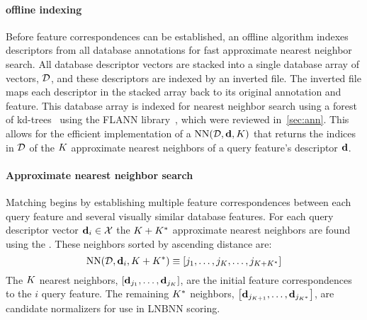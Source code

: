         \paragraph{offline indexing}
            Before feature correspondences can be established, an offline algorithm indexes descriptors from all
              database annotations for fast approximate nearest neighbor search.
            All database descriptor vectors are stacked into a single database array of vectors, %
            $\mathcal{D}$, %
            and these descriptors are indexed by an inverted file.
            The inverted file maps each descriptor in the stacked array back to its original annotation and
              feature.
            This database array is indexed for nearest neighbor search using a forest of
              kd-trees~\cite{silpa_anan_optimised_2008} using the FLANN library~\cite{muja_fast_2009}, which were
              reviewed in~\cref{sec:ann}.
            This allows for the efficient implementation of a   %
            $\operatorname{NN}(\mathcal{D}, \mathbf{d}, K)$  %
            that returns the indices in $\mathcal{D}$ of the $K$ approximate nearest neighbors of a query feature's
              descriptor $\mathbf{d}$.

        \paragraph{Approximate nearest neighbor search}

            Matching begins by establishing multiple feature correspondences between each query feature and
              several visually similar database features.
            For each query descriptor vector $\mathbf{d}_i \in \mathcal{X}$ the $K + K^{*}$ approximate nearest neighbors are
              found using the .
            These neighbors sorted by ascending distance are:
            \begin{equation}
                \operatorname{NN}(\mathcal{D}, \mathbf{d}_i, K + K^{*}) \equiv \left[j_1{}, \ldots{}, j_{K}, \ldots, j_{K + K^{*}}\right]
            \end{equation}
            The $K$ nearest neighbors, $\left[\mathbf{d}_{{j_1}}, \ldots{}, \mathbf{d}_{{j_{K}}}\right]$, are the initial feature
              correspondences to the $i$\th{} query feature.
            The remaining $K^{*}$ neighbors, $\left[\mathbf{d}_{{j_{K + 1}}}, \ldots{}, \mathbf{d}_{j_{K^{*}}}\right]$, are candidate
              normalizers for use in LNBNN scoring.

